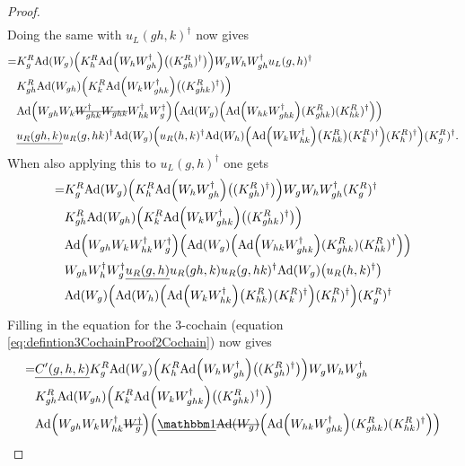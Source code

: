 \documentclass[12pt,a4paper,twoside]{article}
\numberwithin{equation}{section}
\begin{document}
\begin{proof}
\begin{align}
	\end{align}
Doing the same with $u_L(gh,k)^\dagger$ now gives
	\begin{align}
		=&K_g^R\Ad{W_g}\left(K_h^R\Ad{W_hW_{gh}^\dagger}\left((K_{gh}^R)^\dagger\right)\right)W_gW_hW_{gh}^\dagger u_L(g,h)^\dagger\\
		\nonumber
		&K_{gh}^R\Ad{W_{gh}}\left(K_k^R\Ad{W_kW_{ghk}^\dagger}\left((K_{ghk}^R)^\dagger\right)\right)  \\
		\nonumber
		&\Ad{W_{gh}W_k\stkout{W_{ghk}^\dagger W_{ghk}}W_{hk}^\dagger W_{g}^\dagger}  \left(\Ad{W_g}\left( \Ad{W_{hk}W_{ghk}^\dagger}(K^R_{ghk})(K^R_{hk})^{\dagger} \right)\right)\\
		\nonumber
		&\underline{u_R(gh,k)}u_R(g,hk)^\dagger\Ad{W_g}\left(u_R(h,k)^\dagger \Ad{W_h}\left(\Ad{W_kW_{hk}^\dagger}\left(K_{hk}^R\right)(K^R_k)^\dagger\right)(K^R_h)^\dagger\right)(K^R_g)^\dagger.
	\end{align}
When also applying this to $u_L(g,h)^\dagger$ one gets
	\begin{align}
		=&K_g^R\Ad{W_g}\left(K_h^R\Ad{W_hW_{gh}^\dagger}\left((K_{gh}^R)^\dagger\right)\right)W_gW_hW_{gh}^\dagger (K^R_g)^\dagger\\
		\nonumber
		&K_{gh}^R\Ad{W_{gh}}\left(K_k^R\Ad{W_kW_{ghk}^\dagger}\left((K_{ghk}^R)^\dagger\right)\right)\\
		\nonumber
		&\Ad{W_{gh}W_kW_{hk}^\dagger W_{g}^\dagger}  \left(\Ad{W_g}\left( \Ad{W_{hk}W_{ghk}^\dagger}(K^R_{ghk})(K^R_{hk})^{\dagger} \right)\right)\\
		\nonumber
		&W_{gh}W_h^\dagger W_g^\dagger \underline{u_R(g,h)} u_R(gh,k)u_R(g,hk)^\dagger\Ad{W_g}\left(u_R(h,k)^\dagger\right)\\
		\nonumber
		&\Ad{W_g}\left(\Ad{W_h}\left(\Ad{W_kW_{hk}^\dagger}\left(K_{hk}^R\right)(K^R_k)^\dagger\right)(K^R_h)^\dagger\right)(K^R_g)^\dagger
	\end{align}
	Filling in the equation for the 3-cochain (equation \eqref{eq:defintion3CochainProof2Cochain}) now gives
	\begin{align}
		=&\underline{C'(g,h,k)}K_g^R\Ad{W_g}\left(K_h^R\Ad{W_hW_{gh}^\dagger}\left((K_{gh}^R)^\dagger\right)\right)W_gW_hW_{gh}^\dagger \\
		\nonumber
		&K_{gh}^R\Ad{W_{gh}}\left(K_k^R\Ad{W_kW_{ghk}^\dagger}\left((K_{ghk}^R)^\dagger\right)\right)\\
		\nonumber
		&\Ad{W_{gh}W_kW_{hk}^\dagger \stkout{W_{g}^\dagger}}  \left(\underline{\id}\stkout{\Ad{W_g}}\left( \Ad{W_{hk}W_{ghk}^\dagger}(K^R_{ghk})(K^R_{hk})^{\dagger} \right)\right)\\

\end{align}
\end{proof}
\end{document}
